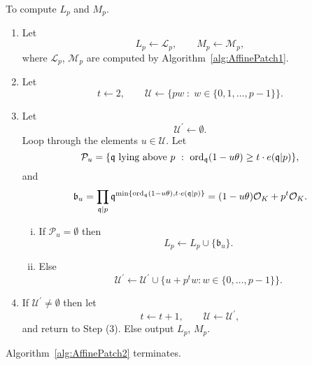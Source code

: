 \begin{algorithm}\label{alg:AffinePatch2}
To compute $L_p$ and $M_p$.

\begin{enumerate}[Step (1)]
\item Let 
\[ L_p \leftarrow \mathcal{L}_p, \qquad M_p \leftarrow \mathcal{M}_p,\]
where $\mathcal{L}_p$, $\mathcal{M}_p$ are computed by Algorithm~\ref{alg:AffinePatch1}.
\item Let
\[ t \leftarrow 2, \qquad \mathcal{U} \leftarrow \{pw \; : \; w \in \{0,1,\dots,p-1\} \}.\]
\item Let
\[ \mathcal{U}^{\prime} \leftarrow \emptyset.\]
Loop through the elements $u \in \mathcal{U}$. Let 
\[\mathcal{P}_u=\{\mathfrak{q} \text{ lying above } p \ : \ \operatorname{ord}_{\mathfrak{q}}(1-u\theta ) \ge t \cdot e(\mathfrak{q}|p)\},\]
and
\[ \mathfrak{b}_u=\prod_{\mathfrak{q} \mid p} \mathfrak{q}^{\min\{\operatorname{ord}_{\mathfrak{q}}(1-u\theta ), t \cdot e(\mathfrak{q}|p)\}} =(1-u\theta) \mathcal{O}_K+p^t \mathcal{O}_K.\]

\begin{enumerate}[(i)]
\item If $\mathcal{P}_u=\emptyset$  
then
\[L_p \leftarrow L_p \cup \{\mathfrak{b}_u\}.\]
\item Else 
\[\mathcal{U}^\prime \leftarrow \mathcal{U}^\prime \cup \{ u+p^{t}w : w \in \{0,\dotsc,p-1\} \}.\]
\end{enumerate}

\item If $\mathcal{U}^\prime \ne \emptyset$ then let
\[t \leftarrow t+1, \qquad \mathcal{U} \leftarrow \mathcal{U}^\prime,\]
and return to Step (3). Else output $L_p$, $M_p$.
\end{enumerate}
\end{algorithm}

\begin{lemma} 
Algorithm~\ref{alg:AffinePatch2} terminates. 
\end{lemma}

